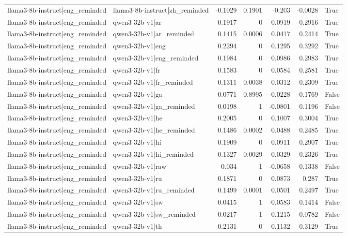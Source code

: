 \begin{table}
\begin{tabular}{l l r r r r l}
llama3-8b-instruct|eng_reminded & llama3-8b-instruct|zh_reminded & -0.1029 & 0.1901 & -0.203 & -0.0028 & True \\
llama3-8b-instruct|eng_reminded & qwen3-32b-v1|ar & 0.1917 & 0 & 0.0919 & 0.2916 & True \\
llama3-8b-instruct|eng_reminded & qwen3-32b-v1|ar_reminded & 0.1415 & 0.0006 & 0.0417 & 0.2414 & True \\
llama3-8b-instruct|eng_reminded & qwen3-32b-v1|eng & 0.2294 & 0 & 0.1295 & 0.3292 & True \\
llama3-8b-instruct|eng_reminded & qwen3-32b-v1|eng_reminded & 0.1984 & 0 & 0.0986 & 0.2983 & True \\
llama3-8b-instruct|eng_reminded & qwen3-32b-v1|fr & 0.1583 & 0 & 0.0584 & 0.2581 & True \\
llama3-8b-instruct|eng_reminded & qwen3-32b-v1|fr_reminded & 0.1311 & 0.0038 & 0.0312 & 0.2309 & True \\
llama3-8b-instruct|eng_reminded & qwen3-32b-v1|ga & 0.0771 & 0.8995 & -0.0228 & 0.1769 & False \\
llama3-8b-instruct|eng_reminded & qwen3-32b-v1|ga_reminded & 0.0198 & 1 & -0.0801 & 0.1196 & False \\
llama3-8b-instruct|eng_reminded & qwen3-32b-v1|he & 0.2005 & 0 & 0.1007 & 0.3004 & True \\
llama3-8b-instruct|eng_reminded & qwen3-32b-v1|he_reminded & 0.1486 & 0.0002 & 0.0488 & 0.2485 & True \\
llama3-8b-instruct|eng_reminded & qwen3-32b-v1|hi & 0.1909 & 0 & 0.0911 & 0.2907 & True \\
llama3-8b-instruct|eng_reminded & qwen3-32b-v1|hi_reminded & 0.1327 & 0.0029 & 0.0329 & 0.2326 & True \\
llama3-8b-instruct|eng_reminded & qwen3-32b-v1|raw & 0.034 & 1 & -0.0658 & 0.1338 & False \\
llama3-8b-instruct|eng_reminded & qwen3-32b-v1|ru & 0.1871 & 0 & 0.0873 & 0.287 & True \\
llama3-8b-instruct|eng_reminded & qwen3-32b-v1|ru_reminded & 0.1499 & 0.0001 & 0.0501 & 0.2497 & True \\
llama3-8b-instruct|eng_reminded & qwen3-32b-v1|sw & 0.0415 & 1 & -0.0583 & 0.1414 & False \\
llama3-8b-instruct|eng_reminded & qwen3-32b-v1|sw_reminded & -0.0217 & 1 & -0.1215 & 0.0782 & False \\
llama3-8b-instruct|eng_reminded & qwen3-32b-v1|th & 0.2131 & 0 & 0.1132 & 0.3129 & True \\

\end{tabular}
\end{table}
